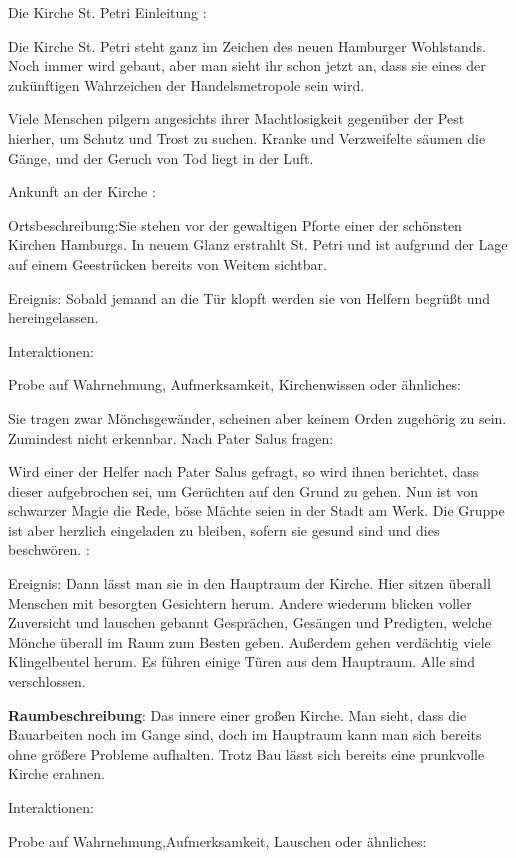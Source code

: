 Die Kirche St. Petri
Einleitung
:

Die Kirche St. Petri steht ganz im Zeichen des neuen Hamburger Wohlstands. Noch immer wird gebaut, aber man sieht ihr schon jetzt an, dass sie eines der zukünftigen Wahrzeichen der Handelsmetropole sein wird.

Viele Menschen pilgern angesichts ihrer Machtlosigkeit gegenüber der Pest hierher, um Schutz und Trost zu suchen. Kranke und Verzweifelte säumen die Gänge, und der Geruch von Tod liegt in der Luft.


Ankunft an der Kirche
:

Ortsbeschreibung:Sie stehen vor der gewaltigen Pforte einer der schönsten Kirchen Hamburgs. In neuem Glanz erstrahlt St. Petri und ist aufgrund der Lage auf einem Geestrücken bereits von Weitem sichtbar.

Ereignis: Sobald jemand an die Tür klopft werden sie von Helfern begrüßt und hereingelassen.

Interaktionen:

Probe auf Wahrnehmung, Aufmerksamkeit, Kirchenwissen oder ähnliches:

Sie tragen zwar Mönchsgewänder, scheinen aber keinem Orden zugehörig zu sein.
Zumindest nicht erkennbar.
Nach Pater Salus fragen:

Wird einer der Helfer nach Pater Salus gefragt, so wird ihnen berichtet, dass dieser aufgebrochen sei, um Gerüchten auf den Grund zu gehen.
Nun ist von schwarzer Magie die Rede, böse Mächte seien in der Stadt am Werk. Die Gruppe ist aber herzlich eingeladen zu bleiben, sofern sie gesund sind und dies beschwören.
:

Ereignis: Dann lässt man sie in den Hauptraum der Kirche. Hier sitzen überall Menschen mit besorgten Gesichtern herum. Andere wiederum blicken voller Zuversicht und lauschen gebannt Gesprächen, Gesängen und Predigten, welche Mönche überall im Raum zum Besten geben. Außerdem gehen verdächtig viele Klingelbeutel herum. Es führen einige Türen aus dem Hauptraum. Alle sind verschlossen.

\textbf{Raumbeschreibung}: Das innere einer großen Kirche. Man sieht, dass die Bauarbeiten noch im Gange sind, doch im Hauptraum kann man sich bereits ohne größere Probleme aufhalten. Trotz Bau lässt sich bereits eine prunkvolle Kirche erahnen.

Interaktionen:

Probe auf Wahrnehmung,Aufmerksamkeit, Lauschen oder ähnliches:

